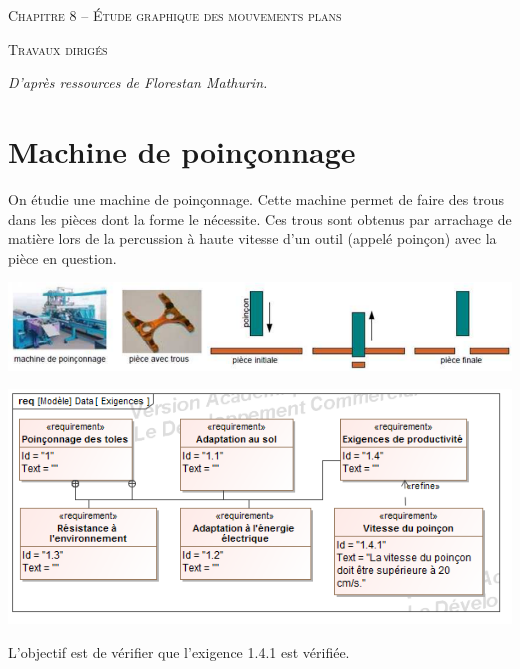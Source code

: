 \documentclass[10pt]{article}
\begin{document}

\begin{center}
\large{\textsc{Chapitre 8 --  Étude graphique des mouvements plans}}
\end{center}

\begin{center}
\textsc{Travaux dirigés}
\end{center}

\normalsize

\begin{flushright}
\textit{D'après ressources de Florestan Mathurin.}
\end{flushright}

 \renewcommand{\baselinestretch}{1.2}


\section{Machine de poinçonnage}

On étudie une machine de poinçonnage. Cette machine permet de faire des trous dans les pièces dont la forme le nécessite. Ces trous sont obtenus par arrachage de matière lors de la percussion à haute vitesse d'un outil (appelé poinçon) avec la pièce en question.

\begin{center}
\includegraphics[width=.9\textwidth]{images/fig1_1}

\includegraphics[width=.7\textwidth]{images/SysML/Exigences}
\end{center}

\begin{Objectif}
L'objectif est de vérifier que l'exigence 1.4.1 est vérifiée.
\end{Objectif}
\end{document}

